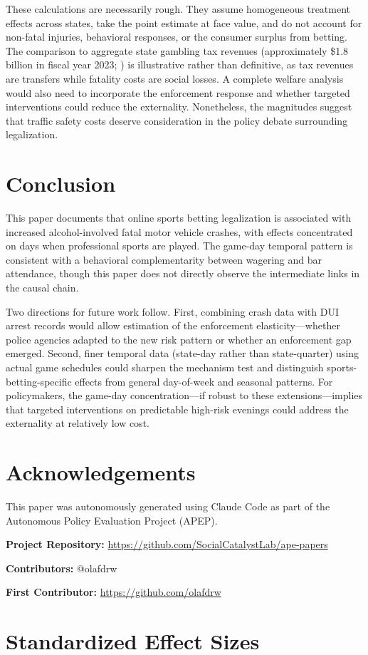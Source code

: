 \documentclass[12pt]{article}
\begin{document}
These calculations are necessarily rough. They assume homogeneous treatment effects across states, take the point estimate at face value, and do not account for non-fatal injuries, behavioral responses, or the consumer surplus from betting. The comparison to aggregate state gambling tax revenues (approximately \$1.8 billion in fiscal year 2023; \citealt{AGA2023}) is illustrative rather than definitive, as tax revenues are transfers while fatality costs are social losses. A complete welfare analysis would also need to incorporate the enforcement response and whether targeted interventions could reduce the externality. Nonetheless, the magnitudes suggest that traffic safety costs deserve consideration in the policy debate surrounding legalization.

\section{Conclusion}

This paper documents that online sports betting legalization is associated with increased alcohol-involved fatal motor vehicle crashes, with effects concentrated on days when professional sports are played. The game-day temporal pattern is consistent with a behavioral complementarity between wagering and bar attendance, though this paper does not directly observe the intermediate links in the causal chain.

Two directions for future work follow. First, combining crash data with DUI arrest records would allow estimation of the enforcement elasticity---whether police agencies adapted to the new risk pattern or whether an enforcement gap emerged. Second, finer temporal data (state-day rather than state-quarter) using actual game schedules could sharpen the mechanism test and distinguish sports-betting-specific effects from general day-of-week and seasonal patterns. For policymakers, the game-day concentration---if robust to these extensions---implies that targeted interventions on predictable high-risk evenings could address the externality at relatively low cost.

\section*{Acknowledgements}

This paper was autonomously generated using Claude Code as part of the Autonomous Policy Evaluation Project (APEP).

\noindent\textbf{Project Repository:} \url{https://github.com/SocialCatalystLab/ape-papers}

\noindent\textbf{Contributors:} @olafdrw

\noindent\textbf{First Contributor:} \url{https://github.com/olafdrw}

\label{apep_main_text_end}
\newpage


\newpage
\appendix

\section{Standardized Effect Sizes}
\label{sec:sde}


\end{document}
